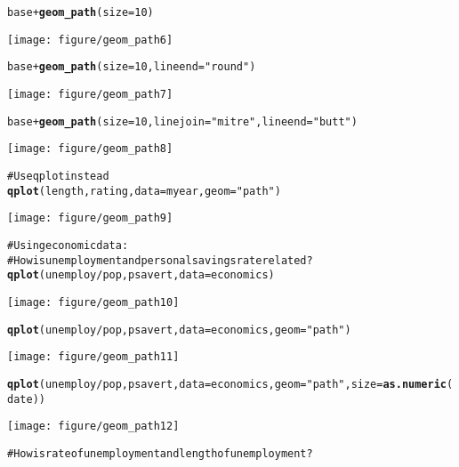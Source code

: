 \documentclass[a4paper,titlepage]{tufte-handout}\usepackage{graphicx, color}
\makeatletter
\def\maxwidth{ %
  \ifdim\Gin@nat@width>\linewidth
    \linewidth
  \else
    \Gin@nat@width
  \fi
}
\newcommand{\hlfunctioncall}[1]{\textcolor[rgb]{0.501960784313725,0,0.329411764705882}{\textbf{#1}}}%
\newcommand{\hlstring}[1]{\textcolor[rgb]{0.6,0.6,1}{#1}}%
\newcommand{\hlcomment}[1]{\textcolor[rgb]{0.180392156862745,0.6,0.341176470588235}{#1}}%
\newenvironment{kframe}{%
 \def\at@end@of@kframe{}%
 \ifinner\ifhmode%
  \def\at@end@of@kframe{\end{minipage}}%
  \begin{minipage}{\columnwidth}%
 \fi\fi%
 \def\FrameCommand##1{\hskip\@totalleftmargin \hskip-\fboxsep
 \colorbox{shadecolor}{##1}\hskip-\fboxsep
     \hskip-\linewidth \hskip-\@totalleftmargin \hskip\columnwidth}%
 \MakeFramed {\advance\hsize-\width
   \@totalleftmargin\z@ \linewidth\hsize
   \@setminipage}}%
 {\par\unskip\endMakeFramed%
 \at@end@of@kframe}
\newenvironment{knitrout}{}{} %
\makeatother
\begin{document}
\begin{knitrout}
\begin{kframe}
\begin{alltt}
base + \hlfunctioncall{geom_path}(size = 10)
\end{alltt}
\end{kframe}\texttt{[image: figure/geom\_path6]} \begin{kframe}\begin{alltt}
base + \hlfunctioncall{geom_path}(size = 10, lineend = \hlstring{"round"})
\end{alltt}
\end{kframe}\texttt{[image: figure/geom\_path7]} \begin{kframe}\begin{alltt}
base + \hlfunctioncall{geom_path}(size = 10, linejoin = \hlstring{"mitre"}, lineend = \hlstring{"butt"})
\end{alltt}
\end{kframe}\texttt{[image: figure/geom\_path8]} \begin{kframe}\begin{alltt}
\hlcomment{# Use qplot instead}
\hlfunctioncall{qplot}(length, rating, data=myear, geom=\hlstring{"path"})
\end{alltt}
\end{kframe}\texttt{[image: figure/geom\_path9]} \begin{kframe}\begin{alltt}
\hlcomment{# Using economic data:}
\hlcomment{# How is unemployment and personal savings rate related?}
\hlfunctioncall{qplot}(unemploy/pop, psavert, data=economics)
\end{alltt}
\end{kframe}\texttt{[image: figure/geom\_path10]} \begin{kframe}\begin{alltt}
\hlfunctioncall{qplot}(unemploy/pop, psavert, data=economics, geom=\hlstring{"path"})
\end{alltt}
\end{kframe}\texttt{[image: figure/geom\_path11]} \begin{kframe}\begin{alltt}
\hlfunctioncall{qplot}(unemploy/pop, psavert, data=economics, geom=\hlstring{"path"}, size=\hlfunctioncall{as.numeric}(date))
\end{alltt}
\end{kframe}\texttt{[image: figure/geom\_path12]} \begin{kframe}\begin{alltt}
\hlcomment{# How is rate of unemployment and length of unemployment?}

\end{alltt}
\end{kframe}
\end{knitrout}
\end{document}
